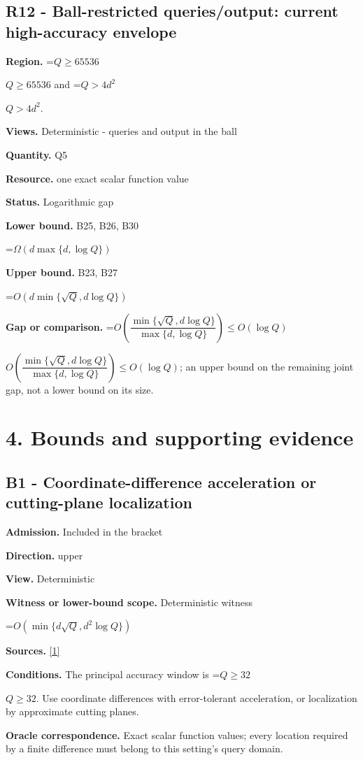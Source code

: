 \documentclass[10pt,a4paper]{article}
\newcommand{\AtlasMath}[1]{\par\begingroup\centering\setbox0=\hbox{$\displaystyle #1$}\ifdim\wd0>1.4\linewidth\typeout{ATLAS WIDE FORMULA: \the\wd0}\fi\ifdim\wd0>\linewidth\resizebox{\linewidth}{!}{\box0}\else\box0\fi\par\endgroup}
\newcommand{\AtlasInlineMath}[1]{\begingroup\setbox0=\hbox{$#1$}\ifdim\wd0>.4\linewidth\endgroup\AtlasMath{#1}\else\endgroup$#1$\fi}
\begin{document}
\subsection{R12 - Ball-restricted queries/output: current high-accuracy envelope}
\textbf{Region.} \AtlasInlineMath{Q\ge65536} and \AtlasInlineMath{Q>4d^2}.

\textbf{Views.} Deterministic - queries and output in the ball

\textbf{Quantity.} Q5

\textbf{Resource.} one exact scalar function value

\textbf{Status.} Logarithmic gap

\textbf{Lower bound.} B25, B26, B30

\AtlasMath{\Omega\!\left(d\max\{d,\log Q\}\right)}
\textbf{Upper bound.} B23, B27

\AtlasMath{O\!\left(d\min\{\sqrt Q,d\log Q\}\right)}
\textbf{Gap or comparison.} \AtlasInlineMath{O\!\left(\dfrac{\min\{\sqrt Q,d\log Q\}}{\max\{d,\log Q\}}\right)\le O(\log Q)}; an upper bound on the remaining joint gap, not a lower bound on its size.

\section{4. Bounds and supporting evidence}
\subsection{B1 - Coordinate-difference acceleration or cutting-plane localization}
\textbf{Admission.} Included in the bracket

\textbf{Direction.} upper

\textbf{View.} Deterministic

\textbf{Witness or lower-bound scope.} Deterministic witness

\AtlasMath{O\!\left(\min\{d\sqrt Q,d^2\log Q\}\right)}
\textbf{Sources.} \href{https://arxiv.org/html/2610.00345v1}{[1]}

\textbf{Conditions.} The principal accuracy window is \AtlasInlineMath{Q\ge32}. Use coordinate differences with error-tolerant acceleration, or localization by approximate cutting planes.

\textbf{Oracle correspondence.} Exact scalar function values; every location required by a finite difference must belong to this setting's query domain.
\end{document}
